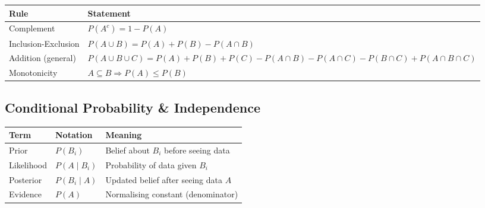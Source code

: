 \documentclass[oneside]{book}
\begin{document}
\begin{center}
\begin{tabularx}{\linewidth}{lX}
\toprule
\textbf{Rule} & \textbf{Statement} \\
\midrule
Complement         & $P(A^c) = 1 - P(A)$ \\
Inclusion-Exclusion & $P(A \cup B) = P(A) + P(B) - P(A \cap B)$ \\
Addition (general) & $P(A \cup B \cup C) = P(A)+P(B)+P(C) - P(A\cap B) - P(A\cap C) - P(B\cap C) + P(A\cap B\cap C)$ \\
Monotonicity       & $A \subseteq B \Rightarrow P(A) \leq P(B)$ \\
\bottomrule
\end{tabularx}
\end{center}

\subsection*{Conditional Probability \& Independence}




\begin{center}
\begin{tabular}{lll}
\toprule
\textbf{Term} & \textbf{Notation} & \textbf{Meaning} \\
\midrule
Prior       & $P(B_i)$         & Belief about $B_i$ before seeing data \\
Likelihood  & $P(A \mid B_i)$  & Probability of data given $B_i$ \\
Posterior   & $P(B_i \mid A)$  & Updated belief after seeing data $A$ \\
Evidence    & $P(A)$           & Normalising constant (denominator) \\
\bottomrule
\end{tabular}
\end{center}

\end{document}
